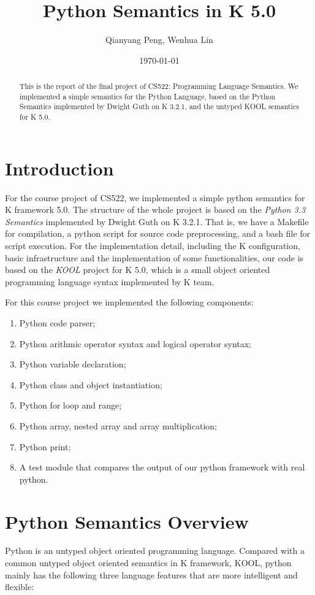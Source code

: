 \documentclass[a4paper]{article}
\title{Python Semantics in K 5.0}
\author{Qianyang Peng, Wenhua Lin}
\date{\today}
\begin{document}
\maketitle

\begin{abstract}
This is the report of the final project of CS522: Programming Language Semantics. We implemented a simple semantics for the Python Language, based on the Python Semantics implemented by Dwight Guth on K 3.2.1, and the untyped KOOL semantics for K 5.0.
\end{abstract}

\section{Introduction}
For the course project of CS522, we implemented a simple python semantics for K framework 5.0. The structure of the whole project is based on the \emph{Python 3.3 Semantics} implemented by Dwight Guth on K 3.2.1. That is, we have a Makefile for compilation, a python script for source code preprocessing, and a bash file for script execution. For the implementation detail, including the K configuration, basic infrastructure and the implementation of some functionalities, our code is based on the \emph{KOOL} project for K 5.0, which is a small object oriented programming language syntax implemented by K team.

For this course project we implemented the following components:

\begin{enumerate}
    \item Python code parser;
    \item Python arithmic operator syntax and logical operator syntax;
    \item Python variable declaration;
    \item Python class and object instantiation;
    \item Python for loop and range;
    \item Python array, nested array and array multiplication;
    \item Python print;
    \item A test module that compares the output of our python framework with real python.
\end{enumerate}

\section{Python Semantics Overview}
Python is an untyped object oriented programming language. Compared with a common untyped object oriented semantics in K framework, KOOL, python mainly has the following three language features that are more intelligent and flexible:
\end{document}
